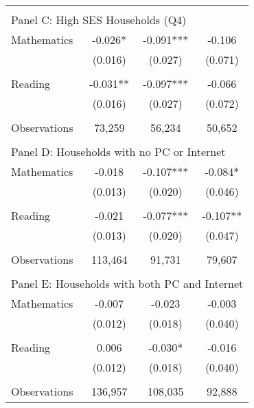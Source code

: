 {\begin{tabular}{lccc}
&  &  &   \\
\multicolumn{4}{l}{Panel C: High SES Households (Q4)} \\
\hspace{3mm}Mathematics&      -0.026*  &      -0.091***&      -0.106   \\
                    &     (0.016)   &     (0.027)   &     (0.071)   \\
 
&  &  &   \\
\hspace{3mm}Reading &      -0.031** &      -0.097***&      -0.066   \\
                    &     (0.016)   &     (0.027)   &     (0.072)   \\
                    &               &               &               \\
\hspace{3mm}Observations&      73,259   &      56,234   &      50,652   \\
 
&  &  &   \\
\multicolumn{4}{l}{Panel D: Households with no PC or Internet} \\
\hspace{3mm}Mathematics&      -0.018   &      -0.107***&      -0.084*  \\
                    &     (0.013)   &     (0.020)   &     (0.046)   \\
 
&  &  &   \\
\hspace{3mm}Reading &      -0.021   &      -0.077***&      -0.107** \\
                    &     (0.013)   &     (0.020)   &     (0.047)   \\
                    &               &               &               \\
\hspace{3mm}Observations&     113,464   &      91,731   &      79,607   \\
 
&  &  &   \\
\multicolumn{4}{l}{Panel E: Households with both PC and Internet} \\
\hspace{3mm}Mathematics&      -0.007   &      -0.023   &      -0.003   \\
                    &     (0.012)   &     (0.018)   &     (0.040)   \\
 
&  &  &   \\
\hspace{3mm}Reading &       0.006   &      -0.030*  &      -0.016   \\
                    &     (0.012)   &     (0.018)   &     (0.040)   \\
                    &               &               &               \\
\hspace{3mm}Observations&     136,957   &     108,035   &      92,888   \\
 

\bottomrule
\end{tabular}
}
